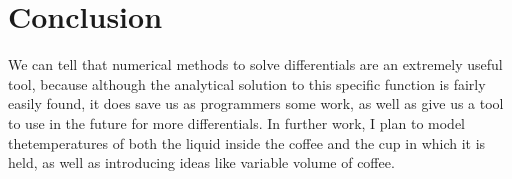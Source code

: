 \documentclass[12pt]{article}
\begin{document}
\section{Conclusion}
We can tell that numerical methods to solve differentials are an extremely useful tool, because although the analytical solution to this specific function is fairly easily found, it does save us as programmers some work, as well as give us a tool to use in the future for more differentials. In further work, I plan to model thetemperatures of both the liquid inside the coffee and the cup in which it is held, as well as introducing ideas like variable volume of coffee.


\end{document}
